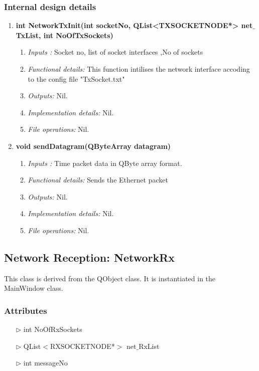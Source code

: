 \begin{enumerate}
\subsubsection{Internal design details }
\begin{enumerate}
	\item  \textbf{ int NetworkTxInit(int socketNo, QList<TXSOCKETNODE*> net$\_$TxList, int NoOfTxSockets)}
	\begin{enumerate}
		\item \textit{Inputs :} Socket no, list of socket interfaces ,No of sockets
		\item \textit{Functional details:} This function intilises the network interface accoding to the config file "TxSocket.txt"
		\item \textit{Outputs:} Nil.
		\item \textit{Implementation details:} Nil.
		\item \textit{File operations:} Nil.
	\end{enumerate}

\item  \textbf{void sendDatagram(QByteArray datagram)}
\begin{enumerate}
	\item \textit{Inputs :} Time packet data in QByte array format.
	\item \textit{Functional details:} Sends the Ethernet packet 
	\item \textit{Outputs:} Nil.
	\item \textit{Implementation details:} Nil.
	\item \textit{File operations:} Nil.
\end{enumerate}
\end{enumerate}


\subsection{Network Reception: NetworkRx} 

This class is derived from the QObject class. It is instantiated in the MainWindow class.
\subsubsection{Attributes}
\begin{enumerate}
	\item [$\rhd$] int NoOfRxSockets
	\item [$\rhd$] QList$<$RXSOCKETNODE*$>$ net$\_$RxList
	\item [$\rhd$] int messageNo
\end{enumerate}


\end{enumerate}
